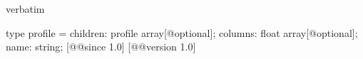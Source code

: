 \begin{camlexample}{verbatim}
\begin{caml}
\begin{camlinput}
type profile = {
  children: profile array[@optional];
  columns: float array[@optional];
  name: string;
} [@@since 1.0]
[@@version 1.0]
\end{camlinput}
\end{caml}
\end{camlexample}
